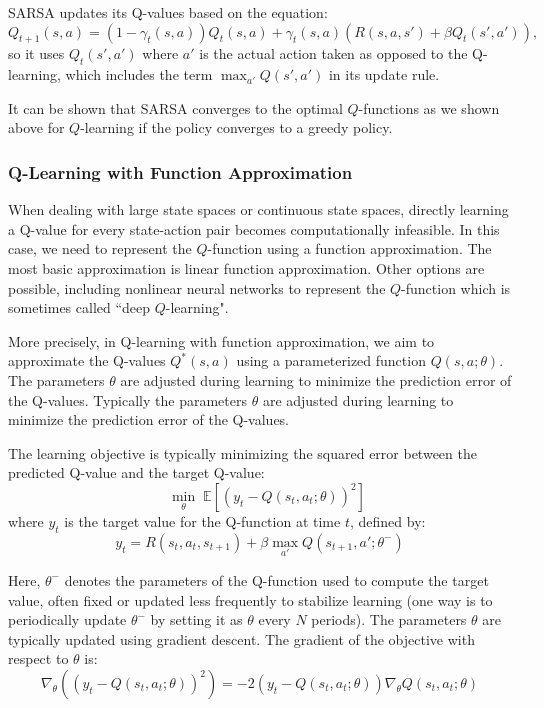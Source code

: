 \documentclass[letter,11pt]{article}
\begin{document}
SARSA updates its Q-values based on the equation:
\[
Q_{t+1}(s, a) = (1 - \gamma_t(s, a)) Q_t(s, a) + \gamma_t(s, a) \left( R(s, a, s') + \beta Q_t(s', a') \right),
\]
so it uses \(Q_t(s', a')\) where \(a'\) is the actual action taken as opposed to the Q-learning, which includes the term \(\max_{a'} Q(s', a')\) in its update rule. 

It can be shown that SARSA converges to the optimal $Q$-functions as we shown above for $Q$-learning if the policy converges to a greedy policy. 


\subsubsection{Q-Learning with Function Approximation} \label{Sec:Qapprox}

When dealing with large state spaces or continuous state spaces, directly learning a Q-value for every state-action pair becomes computationally infeasible. In this case, we need to represent the $Q$-function using a function approximation. The most basic approximation is linear function approximation. Other options are possible, including nonlinear neural networks to represent the $Q$-function which is sometimes called ``deep $Q$-learning". 


More precisely, in Q-learning with function approximation, we aim to approximate the Q-values \( Q^\ast(s, a) \) using a parameterized function \( Q(s, a; \theta) \). The parameters \( \theta \) are adjusted during learning to minimize the prediction error of the Q-values. Typically the parameters \( \theta \) are adjusted during learning to minimize the prediction error of the Q-values.

The learning objective is typically  minimizing the squared error between the predicted Q-value and the target Q-value:
\[ \quad \min_\theta \; \mathbb{E} \left[ \left( y_t - Q(s_t, a_t; \theta) \right)^2 \right] \] 
where \( y_t \) is the target value for the Q-function at time \( t \), defined by:
\[ y_t = R(s_{t},a_{t},s_{t+1}) + \beta \max_{a'} Q(s_{t+1}, a'; \theta^-) \]

Here, \( \theta^- \) denotes the parameters of the Q-function used to compute the target value, often fixed or updated less frequently to stabilize learning (one way is to periodically update $\theta ^{-}$ by setting it as $\theta$ every $N$ periods). 
The parameters \( \theta \) are typically updated using gradient descent. The gradient of the objective with respect to \( \theta \) is:
\[ \nabla_\theta \left( \left( y_t - Q(s_t, a_t; \theta) \right)^2 \right) = -2 \left( y_t - Q(s_t, a_t; \theta) \right) \nabla_\theta Q(s_t, a_t; \theta) \]
\end{document}
